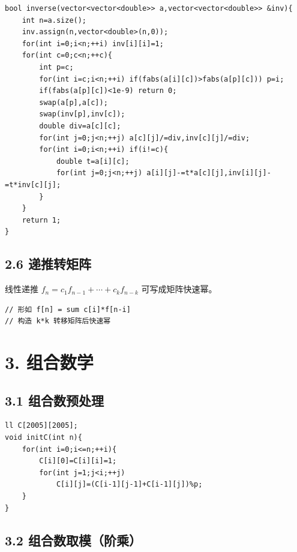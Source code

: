 \documentclass[UTF8,a4paper,11pt]{ctexart}
\begin{document}
\begin{Verbatim}[fontsize=\small,frame=single,breaklines=true,breakanywhere=true]
bool inverse(vector<vector<double>> a,vector<vector<double>> &inv){
    int n=a.size();
    inv.assign(n,vector<double>(n,0));
    for(int i=0;i<n;++i) inv[i][i]=1;
    for(int c=0;c<n;++c){
        int p=c;
        for(int i=c;i<n;++i) if(fabs(a[i][c])>fabs(a[p][c])) p=i;
        if(fabs(a[p][c])<1e-9) return 0;
        swap(a[p],a[c]);
        swap(inv[p],inv[c]);
        double div=a[c][c];
        for(int j=0;j<n;++j) a[c][j]/=div,inv[c][j]/=div;
        for(int i=0;i<n;++i) if(i!=c){
            double t=a[i][c];
            for(int j=0;j<n;++j) a[i][j]-=t*a[c][j],inv[i][j]-=t*inv[c][j];
        }
    }
    return 1;
}
\end{Verbatim}

\subsection*{2.6 递推转矩阵}

线性递推 $f_n=c_1f_{n-1}+\cdots+c_kf_{n-k}$ 可写成矩阵快速幂。

\begin{Verbatim}[fontsize=\small,frame=single,breaklines=true,breakanywhere=true]
// 形如 f[n] = sum c[i]*f[n-i]
// 构造 k*k 转移矩阵后快速幂
\end{Verbatim}


\section*{3. 组合数学}

\subsection*{3.1 组合数预处理}

\begin{Verbatim}[fontsize=\small,frame=single,breaklines=true,breakanywhere=true]
ll C[2005][2005];
void initC(int n){
    for(int i=0;i<=n;++i){
        C[i][0]=C[i][i]=1;
        for(int j=1;j<i;++j)
            C[i][j]=(C[i-1][j-1]+C[i-1][j])%p;
    }
}
\end{Verbatim}

\subsection*{3.2 组合数取模（阶乘）}
\end{document}
